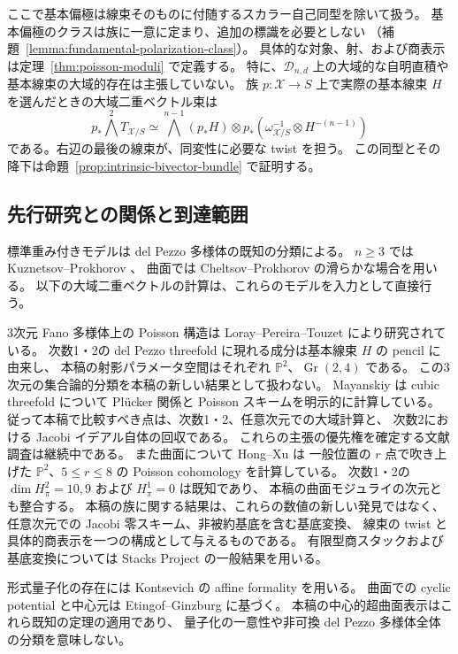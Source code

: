 \documentclass[a4paper,11pt]{ltjsarticle}
\numberwithin{equation}{section}
\theoremstyle{plain}
\theoremstyle{definition}
\newcommand{\Gr}{\operatorname{Gr}}
\begin{document}
ここで基本偏極は線束そのものに付随するスカラー自己同型を除いて扱う。
基本偏極のクラスは族に一意に定まり、追加の標識を必要としない
（補題~\ref{lemma:fundamental-polarization-class}）。
具体的な対象、射、および商表示は定理~\ref{thm:poisson-moduli} で定義する。
特に、$\mathcal D_{n,d}$ 上の大域的な自明直積や基本線束の大域的存在は主張していない。
族 $p:\mathcal X\to S$ 上で実際の基本線束 $H$ を選んだときの大域二重ベクトル束は
\[
 p_*\bigwedge^2T_{\mathcal X/S}
 \simeq\bigwedge^{n-1}(p_*H)\otimes
 p_*(\omega_{\mathcal X/S}^{-1}\otimes H^{-(n-1)})
\]
である。右辺の最後の線束が、同変性に必要な twist を担う。
この同型とその降下は命題~\ref{prop:intrinsic-bivector-bundle} で証明する。

\subsection{先行研究との関係と到達範囲}
標準重み付きモデルは del Pezzo 多様体の既知の分類による。
$n\geq3$ では Kuznetsov--Prokhorov \cite[Theorem 1.2(i),(ii)]{KP2023}、
曲面では Cheltsov--Prokhorov \cite[Theorem 2.5]{CP2021} の滑らかな場合を用いる。
以下の大域二重ベクトルの計算は、これらのモデルを入力として直接行う。

3次元 Fano 多様体上の Poisson 構造は Loray--Pereira--Touzet
\cite[Theorems 7.1, 9.1]{LPT2013} により研究されている。
次数1・2の del Pezzo threefold に現れる成分は基本線束 $H$ の pencil に由来し、
本稿の射影パラメータ空間はそれぞれ $\mathbb P^2$、$\Gr(2,4)$ である。
この3次元の集合論的分類を本稿の新しい結果として扱わない。
Mayanskiy \cite[Introduction, Theorem 1]{Mayanskiy2015} は cubic threefold について
Pl\"ucker 関係と Poisson スキームを明示的に計算している。
従って本稿で比較すべき点は、次数1・2、任意次元での大域計算と、
次数2における Jacobi イデアル自体の回収である。
これらの主張の優先権を確定する文献調査は継続中である。
また曲面について Hong--Xu \cite[Theorem 3.9]{HongXu2011} は
一般位置の $r$ 点で吹き上げた $\mathbb P^2$、$5\leq r\leq8$ の
Poisson cohomology を計算している。
次数1・2の $\dim H^2_\pi=10,9$ および $H^1_\pi=0$ は既知であり、
本稿の曲面モジュライの次元とも整合する。
本稿の族に関する結果は、これらの数値の新しい発見ではなく、
任意次元での Jacobi 零スキーム、非被約基底を含む基底変換、
線束の twist と具体的商表示を一つの構成として与えるものである。
有限型商スタックおよび基底変換については
Stacks Project \cite[Tags 0B91, 06FI, 0DSL]{StacksProject} の一般結果を用いる。

形式量子化の存在には Kontsevich の affine formality \cite{Kontsevich} を用いる。
曲面での cyclic potential と中心元は
Etingof--Ginzburg \cite[Lemma 7.4.2, Proposition 8.1.1(i)]{EG2010} に基づく。
本稿の中心的超曲面表示はこれら既知の定理の適用であり、
量子化の一意性や非可換 del Pezzo 多様体全体の分類を意味しない。
\end{document}
